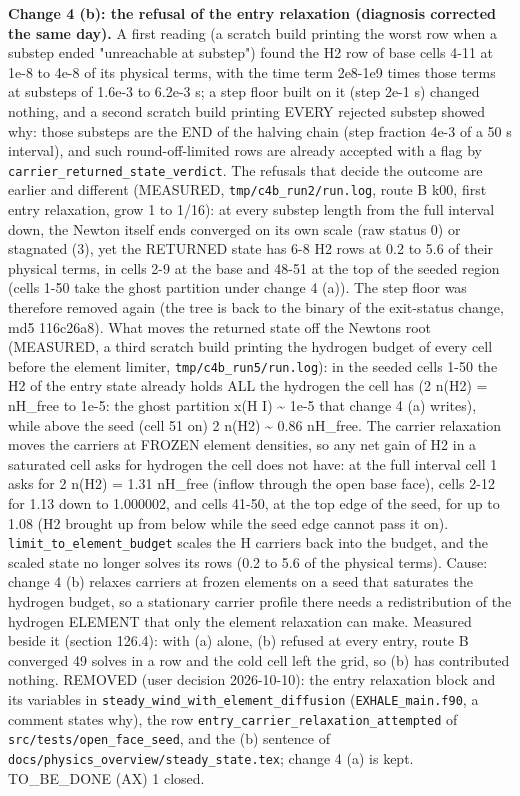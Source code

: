 \documentclass[english,a4paper]{my_memo}
\begin{document}
\textbf{Change 4 (b): the refusal of the entry relaxation (diagnosis corrected the same day).}
A first reading (a scratch build printing the worst row when a substep ended
"unreachable at substep") found the H2 row of base cells 4-11 at 1e-8 to 4e-8 of
its physical terms, with the time term 2e8-1e9 times those terms at substeps of
1.6e-3 to 6.2e-3 s; a step floor built on it (step 2e-1 s) changed nothing, and a
second scratch build printing EVERY rejected substep showed why: those substeps
are the END of the halving chain (step fraction 4e-3 of a 50 s interval), and
such round-off-limited rows are already accepted with a flag by
\texttt{carrier\_returned\_state\_verdict}. The refusals that decide the outcome are
earlier and different (MEASURED, \texttt{tmp/c4b\_run2/run.log}, route B k00, first
entry relaxation, grow 1 to 1/16): at every substep length from the full
interval down, the Newton itself ends converged on its own scale (raw status 0)
or stagnated (3), yet the RETURNED state has 6-8 H2 rows at 0.2 to 5.6 of
their physical terms, in cells 2-9 at the base and 48-51 at the top of the
seeded region (cells 1-50 take the ghost partition under change 4 (a)). The
step floor was therefore removed again (the tree is back to the binary of the
exit-status change, md5 116c26a8). What moves the returned state off the Newton\textquotesingle s
root (MEASURED, a third scratch build printing the hydrogen budget of every
cell before the element limiter, \texttt{tmp/c4b\_run5/run.log}): in the seeded cells
1-50 the H2 of the entry state already holds ALL the hydrogen the cell has
(2 n(H2) = nH\_free to 1e-5: the ghost partition x(H I) \textasciitilde{} 1e-5 that change 4 (a)
writes), while above the seed (cell 51 on) 2 n(H2) \textasciitilde{} 0.86 nH\_free. The carrier
relaxation moves the carriers at FROZEN element densities, so any net gain of
H2 in a saturated cell asks for hydrogen the cell does not have: at the full
interval cell 1 asks for 2 n(H2) = 1.31 nH\_free (inflow through the open base
face), cells 2-12 for 1.13 down to 1.000002, and cells 41-50, at the top edge of
the seed, for up to 1.08 (H2 brought up from below while the seed edge cannot
pass it on). \texttt{limit\_to\_element\_budget} scales the H carriers back into the
budget, and the scaled state no longer solves its rows (0.2 to 5.6 of the
physical terms). Cause: change 4 (b) relaxes carriers at frozen elements on a
seed that saturates the hydrogen budget, so a stationary carrier profile there
needs a redistribution of the hydrogen ELEMENT that only the element
relaxation can make. Measured beside it (section 126.4): with (a) alone, (b)
refused at every entry, route B converged 49 solves in a row and the cold cell
left the grid, so (b) has contributed nothing. REMOVED (user decision
2026-10-10): the entry relaxation block and its variables in
\texttt{steady\_wind\_with\_element\_diffusion} (\texttt{EXHALE\_main.f90}, a comment states why),
the row \texttt{entry\_carrier\_relaxation\_attempted} of \texttt{src/tests/open\_face\_seed}, and
the (b) sentence of \texttt{docs/physics\_overview/steady\_state.tex}; change 4 (a) is
kept. TO\_BE\_DONE (AX) 1 closed.
\end{document}
